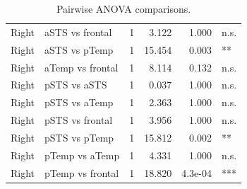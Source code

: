 \begin{table}[h]
\begin{tabular}{llrrrl}
 Right        & aSTS vs frontal  &    1 &    3.122 &     1.000 & n.s.   \\
 Right        & aSTS vs pTemp    &    1 &   15.454 &     0.003 & **     \\
 Right        & aTemp vs frontal &    1 &    8.114 &     0.132 & n.s.   \\
 Right        & pSTS vs aSTS     &    1 &    0.037 &     1.000 & n.s.   \\
 Right        & pSTS vs aTemp    &    1 &    2.363 &     1.000 & n.s.   \\
 Right        & pSTS vs frontal  &    1 &    3.956 &     1.000 & n.s.   \\
 Right        & pSTS vs pTemp    &    1 &   15.812 &     0.002 & **     \\
 Right        & pTemp vs aTemp   &    1 &    4.331 &     1.000 & n.s.   \\
 Right        & pTemp vs frontal &    1 &   18.820 &   4.3e-04 & ***    \\
\bottomrule
\end{tabular}
\caption{Pairwise ANOVA comparisons.}
\end{table}